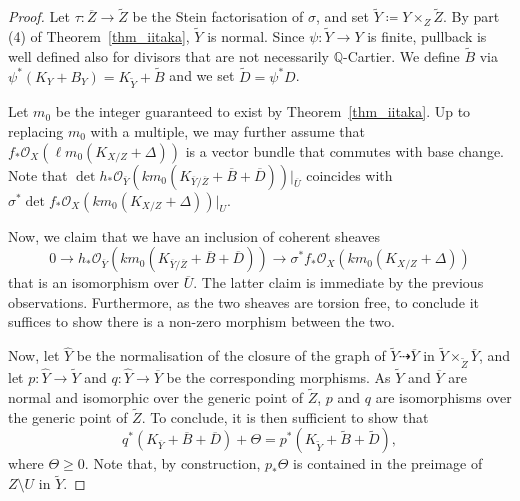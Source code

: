 \documentclass[12pt]{amsart}
\theoremstyle{plain}
\theoremstyle{definition}
\def\scr #1.{\mathcal #1}
\def\det{\operatorname{det}}
\def\rar{\rightarrow}
\def\drar{\dashrightarrow}
\def\K#1.{K_{#1}}
\def\subs#1.{_{#1}}
\begin{document}
\begin{proof}
Let $\tau\colon \overline{Z} \rightarrow \tilde{Z}$ be the Stein factorisation of $\sigma$, and set $\tilde{Y} \coloneqq Y\times_Z\tilde{Z}$.
By part (4) of Theorem~\ref{thm_iitaka}, $\tilde{Y}$ is normal.
Since $\psi \colon \tilde{Y} \to Y$ is finite, pullback is well defined also for divisors that are not necessarily $\mathbb Q$-Cartier.
We define $\tilde{B}$ via $\psi^*(K_Y+B_Y) = K_{\tilde{Y}}+\tilde{B}$ and we set $\tilde{D}=\psi^*D$.



Let $m_0$ be the integer guaranteed to exist by  Theorem~\ref{thm_iitaka}.
Up to replacing $m_0$
with a multiple, we may further assume that $f_* \scr O_X.(\ell m_0(\K X/Z.+\Delta))$ 
is a vector bundle that commutes with base change.
Note that $\det h \subs *. \scr O_{\overline{Y}}.(km_0(\K \overline Y /\overline Z. + \overline B  + \overline D ))\vert_{\overline{U}}$ 
coincides with $\sigma^*\det f_* \scr O_X.(km_0(\K X/Z.+\Delta))\vert_{U}$.


Now, we claim that 
we have an inclusion of coherent sheaves
\begin{equation} \label{inj_vb}
0 \rar h \subs *. \scr O_{\overline {Y}}.(km_0(\K \overline Y /\overline Z. + \overline B  + \overline D )) 
\rar \sigma^*f_* \scr O_X.(km_0(\K X/Z.+\Delta))
\end{equation}
that is an isomorphism over $\overline{U}$.
The latter claim is immediate by the previous observations.
Furthermore, as the two sheaves are torsion free, to conclude it suffices to show there is a non-zero morphism between the two.


Now, let $\hat{Y}$ be the normalisation of the closure of the graph of $\tilde{Y} \drar \overline{Y}$ in $\tilde{Y} \times_{\tilde Z} \overline{Y}$, and let $p \colon \hat{Y} \rar \tilde Y$ and $q \colon \hat{Y} \rar \overline{Y}$ be the corresponding morphisms.
As $\tilde Y$ and $\overline Y$ are normal and isomorphic over the generic point of $\tilde Z$, $p$ and $q$ are isomorphisms over the generic point of $\tilde Z$.
To conclude, it is then sufficient to show that
\begin{equation} \label{ineq_divisors}
q^*(\K \overline{Y}. + \overline{B} + \overline{D}) +\Theta= p^*(\K \tilde Y. + \tilde B +\tilde D),
\end{equation}
where $\Theta \geq 0$.
Note that, by construction, $p_*\Theta$ is contained in the preimage of $Z \setminus U$ in $\tilde Y$.


\end{proof}
\end{document}
